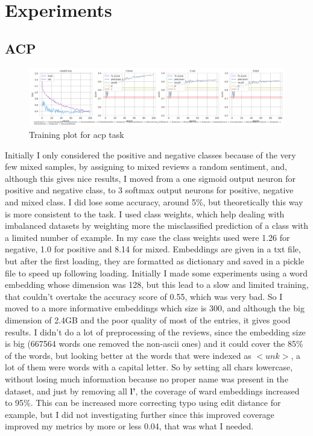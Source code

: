 \documentclass{article}
\begin{document}
    \section{Experiments}\label{sec:s4}
        \subsection{ACP}\label{subsec:s1}
            \begin{figure}
                \includegraphics[width=\linewidth]{../experiments/acp/plots.png}
                \caption{Training plot for acp task}
                \label{fig:train-acp}
            \end{figure}
            Initially I only considered the positive and negative classes because of the very few mixed samples, by assigning to mixed reviews a random sentiment, and, although this gives nice results, I moved from a one sigmoid output neuron for positive and negative class, to 3 softmax output neurons for positive, negative and mixed class.
            I did lose some accuracy, around 5\%, but theoretically this way is more consistent to the task.
            I used class weights, which help dealing with imbalanced datasets by weighting more the misclassified prediction of a class with a limited number of example.
            In my case the class weights used were 1.26 for negative, 1.0 for positive and 8.14 for mixed.
            Embeddings are given in a txt file, but after the first loading, they are formatted as dictionary and saved in a pickle file to speed up following loading.
            Initially I made some experiments using a word embedding whose dimension was 128, but this lead to a slow and limited training, that couldn't overtake the accuracy score of 0.55, which was very bad.
            So I moved to a more informative embeddings which size is 300, and although the big dimension of 2.4GB and the poor quality of most of the entries, it gives good results.
            I didn't do a lot of preprocessing of the reviews, since the embedding size is big (667564 words one removed the non-ascii ones) and it could cover the 85\% of the words, but looking better at the words that were indexed as $<unk>$, a lot of them were words with a capital letter.
            So by setting all chars lowercase, without losing much information because no proper name was present in the dataset, and just by removing all \textbf{l'}, the coverage of ward embeddings increased to 95\%.
            This can be increased more correcting typo using edit distance for example, but I did not investigating further since this improved coverage improved my metrics by more or less 0.04, that was what I needed.
\end{document}
